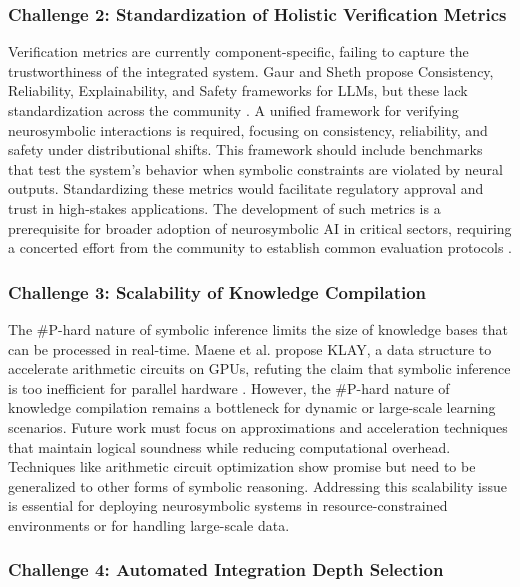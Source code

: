 \documentclass{article}
\begin{document}
\subsubsection{Challenge 2: Standardization of Holistic Verification Metrics}

\label{sec:challenge_2_standardization_of_holistic_}

Verification metrics are currently component-specific, failing to capture the trustworthiness of the integrated system. Gaur and Sheth propose Consistency, Reliability, Explainability, and Safety frameworks for LLMs, but these lack standardization across the community \cite{gaur2023building}. A unified framework for verifying neurosymbolic interactions is required, focusing on consistency, reliability, and safety under distributional shifts. This framework should include benchmarks that test the system's behavior when symbolic constraints are violated by neural outputs. Standardizing these metrics would facilitate regulatory approval and trust in high-stakes applications. The development of such metrics is a prerequisite for broader adoption of neurosymbolic AI in critical sectors, requiring a concerted effort from the community to establish common evaluation protocols \cite{renkhoff2024survey}.

\subsubsection{Challenge 3: Scalability of Knowledge Compilation}

\label{sec:challenge_3_scalability_of_knowledge_com}

The \#P-hard nature of symbolic inference limits the size of knowledge bases that can be processed in real-time. Maene et al. propose KLAY, a data structure to accelerate arithmetic circuits on GPUs, refuting the claim that symbolic inference is too inefficient for parallel hardware \cite{maene2024klay}. However, the \#P-hard nature of knowledge compilation remains a bottleneck for dynamic or large-scale learning scenarios. Future work must focus on approximations and acceleration techniques that maintain logical soundness while reducing computational overhead. Techniques like arithmetic circuit optimization show promise but need to be generalized to other forms of symbolic reasoning. Addressing this scalability issue is essential for deploying neurosymbolic systems in resource-constrained environments or for handling large-scale data.

\subsubsection{Challenge 4: Automated Integration Depth Selection}
\end{document}
